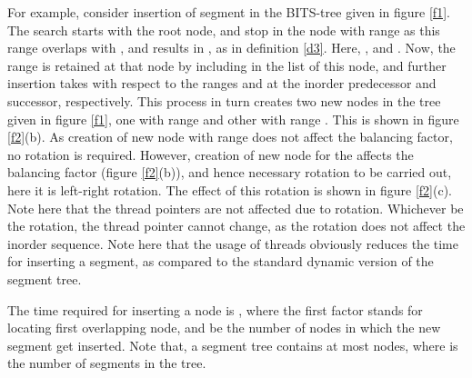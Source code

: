 \documentclass{article}
\begin{document}
\par
For example, consider insertion of segment  in the BITS-tree given in figure \ref{f1}. The search starts with the root node, and stop in the node with range  as this range overlaps with , and  results in , as in definition \ref{d3}. Here, ,  and . Now, the range  is  retained at that node by including  in the list of this node, and further insertion takes with respect to the ranges  and  at the inorder predecessor and successor, respectively. This process in turn creates two new nodes in the tree given in figure \ref{f1}, one with range  and other with range . This is shown in figure \ref{f2}(b). As creation of new node with range   does not affect the balancing factor, no rotation is required. However, creation of new node for the  affects the balancing factor (figure \ref{f2}(b)), and hence necessary rotation to be carried out, here it is left-right rotation. The effect of this rotation is shown in figure \ref{f2}(c). Note here that the thread pointers are not affected due to rotation. Whichever be the rotation, the thread pointer cannot change, as the rotation does not affect the inorder sequence. Note here that the usage of threads obviously reduces the time for inserting a segment, as compared to the standard dynamic version of the segment tree. \par
The time required for inserting a node is , where the first factor  stands for locating first overlapping node, and  be the number of nodes in which the new segment get inserted.  Note that, a segment tree contains at most  nodes, where  is the number of segments in the tree. 
\end{document}
